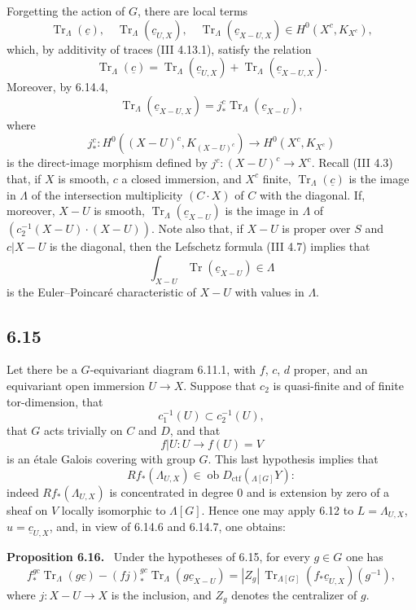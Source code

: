 \documentclass[11pt]{article}
\newenvironment{statement}[1]{\par\medskip\noindent\textbf{#1.}\ }{\par\medskip}
\providecommand{\Tr}{\operatorname{Tr}}
\providecommand{\Tr}{\operatorname{Tr}}
\providecommand{\Ob}{\operatorname{ob}}
\providecommand{\Tr}{\operatorname{Tr}}
\providecommand{\Ob}{\operatorname{ob}}
\providecommand{\Tr}{\operatorname{Tr}}
\providecommand{\Ob}{\operatorname{Ob}}
\providecommand{\Tr}{\operatorname{Tr}}
\providecommand{\Ob}{\operatorname{ob}}
\providecommand{\Ob}{\operatorname{Ob}}
\begin{document}
Forgetting the action of $G$, there are local terms
\begin{equation}
\Tr_{\Lambda}(\underline c),\quad
\Tr_{\Lambda}(\underline c_{U,X}),\quad
\Tr_{\Lambda}(\underline c_{X-U,X})
\in H^0(X^c,K_{X^c}),
\tag{6.14.5}
\end{equation}
which, by additivity of traces (III 4.13.1), satisfy the relation
\begin{equation}
\Tr_{\Lambda}(\underline c)
=
\Tr_{\Lambda}(\underline c_{U,X})
+
\Tr_{\Lambda}(\underline c_{X-U,X}).
\tag{6.14.6}
\end{equation}
Moreover, by 6.14.4,
\begin{equation}
\Tr_{\Lambda}(\underline c_{X-U,X})
=
j_*^c\Tr_{\Lambda}(\underline c_{X-U}),
\tag{6.14.7}
\end{equation}
where
\[
j_*^c:H^0((X-U)^c,K_{(X-U)^c})\longrightarrow H^0(X^c,K_{X^c})
\]
is the direct-image morphism defined by $j^c:(X-U)^c\to X^c$. Recall (III 4.3) that, if $X$ is smooth, $c$ a closed immersion, and $X^c$ finite, $\Tr_{\Lambda}(\underline c)$ is the image in $\Lambda$ of the intersection multiplicity $(C\cdot X)$ of $C$ with the diagonal. If, moreover, $X-U$ is smooth, $\Tr_{\Lambda}(\underline c_{X-U})$ is the image in $\Lambda$ of $(c_2^{-1}(X-U)\cdot(X-U))$. Note also that, if $X-U$ is proper over $S$ and $c|X-U$ is the diagonal, then the Lefschetz formula (III 4.7) implies that
\[
\int_{X-U}\Tr(\underline c_{X-U})\in\Lambda
\]
is the Euler--Poincaré characteristic of $X-U$ with values in $\Lambda$.

\subsection*{6.15}
Let there be a $G$-equivariant diagram 6.11.1, with $f$, $c$, $d$ proper, and an equivariant open immersion $U\to X$. Suppose that $c_2$ is quasi-finite and of finite tor-dimension, that
\[
c_1^{-1}(U)\subset c_2^{-1}(U),
\]
that $G$ acts trivially on $C$ and $D$, and that
\[
f|U:U\longrightarrow f(U)=V
\]
is an étale Galois covering with group $G$. This last hypothesis implies that
\[
Rf_*(\Lambda_{U,X})\in\Ob D_{\mathrm{ctf}}({}_{\Lambda[G]}Y):
\]
indeed $Rf_*(\Lambda_{U,X})$ is concentrated in degree $0$ and is extension by zero of a sheaf on $V$ locally isomorphic to $\Lambda[G]$. Hence one may apply 6.12 to $L=\Lambda_{U,X}$, $u=\underline c_{U,X}$, and, in view of 6.14.6 and 6.14.7, one obtains:

\begin{statement}{Proposition 6.16}
Under the hypotheses of 6.15, for every $g\in G$ one has
\begin{equation}
f_*^{gc}\Tr_{\Lambda}(g\underline c)
-(fj)_*^{gc}\Tr_{\Lambda}(g\underline c_{X-U})
=
|Z_g|\,\Tr_{\Lambda[G]}(f_*\underline c_{U,X})(g^{-1}),
\tag{6.16.1}
\end{equation}
where $j:X-U\to X$ is the inclusion, and $Z_g$ denotes the centralizer of $g$.
\end{statement}
\end{document}
